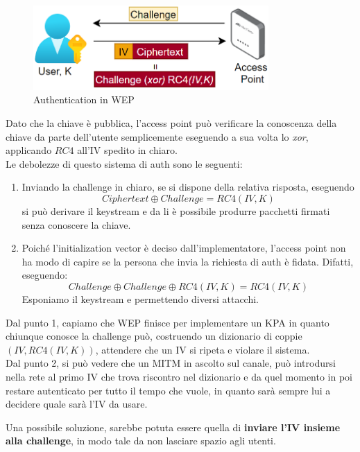 \begin{figure}[h]
    \centering
    \includegraphics[width=0.8\textwidth]{image/wepchallenge.png}
    \caption{Authentication in WEP}
    \label{fig:wepchallenge}
\end{figure}
Dato che la chiave è pubblica, l'access point può verificare la conoscenza della chiave da parte dell'utente semplicemente eseguendo a sua volta lo \textit{xor}, applicando $RC4$ all'IV spedito in chiaro.\\
Le debolezze di questo sistema di auth sono le seguenti:
\begin{enumerate}
    \item Inviando la challenge in chiaro, se si dispone della relativa risposta, eseguendo \[Ciphertext\oplus{Challenge}=RC4(IV,K)\]
    si può derivare il keystream e da li è possibile produrre pacchetti firmati senza conoscere la chiave.
    \item Poiché l'initialization vector è deciso dall'implementatore, l'access point non ha modo di capire se la persona che invia la richiesta di auth è fidata. Difatti, eseguendo:
    \[
    Challenge\oplus{Challenge\oplus{RC4(IV,K)}}=RC4(IV,K)
    \]
    Esponiamo il keystream e permettendo diversi attacchi.
\end{enumerate}
Dal punto 1, capiamo che WEP finisce per implementare un KPA in quanto chiunque conosce la challenge può, costruendo un dizionario di coppie $(IV,RC4(IV,K))$, attendere che un IV si ripeta e violare il sistema.\\
Dal punto 2, si può vedere che un MITM in ascolto sul canale, può introdursi nella rete al primo IV che trova riscontro nel dizionario e da quel momento in poi restare autenticato per tutto il tempo che vuole, in quanto sarà sempre lui a decidere quale sarà l'IV da usare.\\
\begin{remark}
Una possibile soluzione, sarebbe potuta essere quella di \textbf{inviare l'IV insieme alla challenge}, in modo tale da non lasciare spazio agli utenti.
\end{remark}\pagebreak
